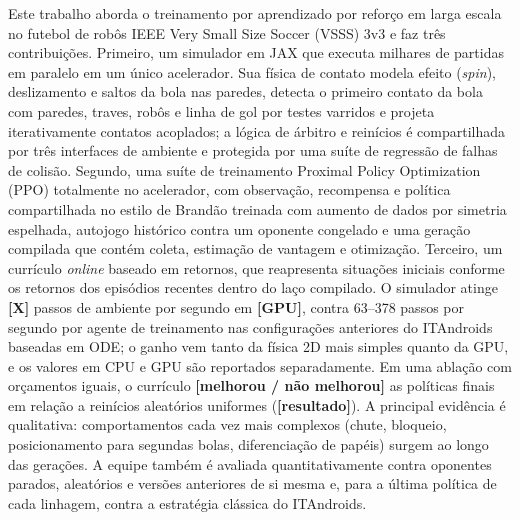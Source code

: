 Este trabalho aborda o treinamento por aprendizado por reforço em larga escala no futebol de robôs IEEE Very Small Size Soccer (VSSS) 3v3 e faz três contribuições. Primeiro, um simulador em JAX que executa milhares de partidas em paralelo em um único acelerador. Sua física de contato modela efeito (\emph{spin}), deslizamento e saltos da bola nas paredes, detecta o primeiro contato da bola com paredes, traves, robôs e linha de gol por testes varridos e projeta iterativamente contatos acoplados; a lógica de árbitro e reinícios é compartilhada por três interfaces de ambiente e protegida por uma suíte de regressão de falhas de colisão. Segundo, uma suíte de treinamento Proximal Policy Optimization (PPO) totalmente no acelerador, com observação, recompensa e política compartilhada no estilo de Brand\~ao treinada com aumento de dados por simetria espelhada, autojogo histórico contra um oponente congelado e uma geração compilada que contém coleta, estimação de vantagem e otimização. Terceiro, um currículo \emph{online} baseado em retornos, que reapresenta situações iniciais conforme os retornos dos episódios recentes dentro do laço compilado. O simulador atinge \textbf{[X]} passos de ambiente por segundo em \textbf{[GPU]}, contra 63--378 passos por segundo por agente de treinamento nas configurações anteriores do ITAndroids baseadas em ODE; o ganho vem tanto da física 2D mais simples quanto da GPU, e os valores em CPU e GPU são reportados separadamente. Em uma ablação com orçamentos iguais, o currículo \textbf{[melhorou / não melhorou]} as políticas finais em relação a reinícios aleatórios uniformes (\textbf{[resultado]}). A principal evidência é qualitativa: comportamentos cada vez mais complexos (chute, bloqueio, posicionamento para segundas bolas, diferenciação de papéis) surgem ao longo das gerações. A equipe também é avaliada quantitativamente contra oponentes parados, aleatórios e versões anteriores de si mesma e, para a última política de cada linhagem, contra a estratégia clássica do ITAndroids.
